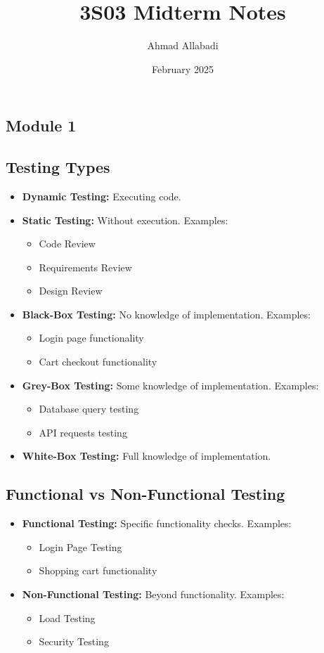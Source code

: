 \documentclass[10pt,portrait]{article}
\begin{document}
\small

\begin{multicols}{ 2 }
\title{3S03 Midterm Notes}
\author{Ahmad Allabadi}
\date{February 2025}

\section*{Module 1}

\subsection*{Testing Types}
\begin{itemize}
    \item \textbf{Dynamic Testing:} Executing code.
    \item \textbf{Static Testing:} Without execution. Examples:
    \begin{itemize}
        \item Code Review
        \item Requirements Review
        \item Design Review
    \end{itemize}
    \item \textbf{Black-Box Testing:} No knowledge of implementation. Examples:
    \begin{itemize}
        \item Login page functionality
        \item Cart checkout functionality
    \end{itemize}
    \item \textbf{Grey-Box Testing:} Some knowledge of implementation. Examples:
    \begin{itemize}
        \item Database query testing
        \item API requests testing
    \end{itemize}
    \item \textbf{White-Box Testing:} Full knowledge of implementation.
\end{itemize}

\subsection*{Functional vs Non-Functional Testing}
\begin{itemize}
    \item \textbf{Functional Testing:} Specific functionality checks. Examples:
    \begin{itemize}
        \item Login Page Testing
        \item Shopping cart functionality
    \end{itemize}
    \item \textbf{Non-Functional Testing:} Beyond functionality. Examples:
    \begin{itemize}
        \item Load Testing
        \item Security Testing
    \end{itemize}
\end{itemize}


\end{multicols}
\end{document}
